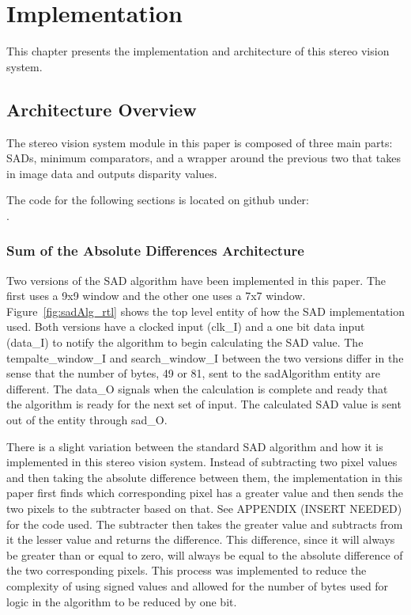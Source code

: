 \chapter{Implementation}
\label{sec:impl}

This chapter presents the implementation and architecture of this stereo vision system.

\section{Architecture Overview}

The stereo vision system module in this paper is composed of three main parts: SADs, minimum comparators, and a wrapper around the previous two that takes in image data and outputs disparity values.

The code for the following sections is located on github under:
\\.

\subsection{Sum of the Absolute Differences Architecture}

Two versions of the SAD algorithm have been implemented in this paper. The first uses a 9x9 window and the other one uses a 7x7 window. Figure~\ref{fig:sadAlg_rtl} shows the top level entity of how the SAD implementation used. Both versions have a clocked input (clk\_I) and a one bit data input (data\_I) to notify the algorithm to begin calculating the SAD value. The tempalte\_window\_I and search\_window\_I between the two versions differ in the sense that the number of bytes, 49 or 81, sent to the sadAlgorithm entity are different. The data\_O signals when the calculation is complete and ready that the algorithm is ready for the next set of input. The calculated SAD value is sent out of the entity through sad\_O.

There is a slight variation between the standard SAD algorithm and how it is implemented in this stereo vision system. Instead of subtracting two pixel values and then taking the absolute difference between them, the implementation in this paper first finds which corresponding pixel has a greater value and then sends the two pixels to the subtracter based on that. See APPENDIX (INSERT NEEDED) for the code used. The subtracter then takes the greater value and subtracts from it the lesser value and returns the difference. This difference, since it will always be greater than or equal to zero, will always be equal to the absolute difference of the two corresponding pixels. This process was implemented to reduce the complexity of using signed values and allowed for the number of bytes used for logic in the algorithm to be reduced by one bit.

